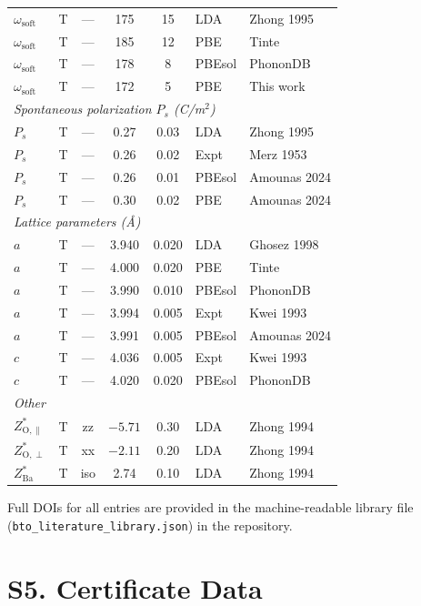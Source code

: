 ﻿\documentclass[prb,onecolumn,superscriptaddress,amsmath,amssymb,longbibliography]{revtex4-2}
\begin{document}
\begin{table}[ht]
\begin{tabular}{llcccll}
$\omega_{\mathrm{soft}}$ & T & --- & 175 & 15 & LDA & Zhong 1995 \\
$\omega_{\mathrm{soft}}$ & T & --- & 185 & 12 & PBE & Tinte \cite{Tinte2003} \\
$\omega_{\mathrm{soft}}$ & T & --- & 178 & 8 & PBEsol & PhononDB \\
$\omega_{\mathrm{soft}}$ & T & --- & 172 & 5 & PBE & This work \\
\midrule
\multicolumn{7}{l}{\textit{Spontaneous polarization $P_s$ (C/m$^2$)}} \\
$P_s$ & T & --- & 0.27 & 0.03 & LDA & Zhong 1995 \\
$P_s$ & T & --- & 0.26 & 0.02 & Expt & Merz 1953 \\
$P_s$ & T & --- & 0.26 & 0.01 & PBEsol & Amounas 2024 \\
$P_s$ & T & --- & 0.30 & 0.02 & PBE & Amounas 2024 \\
\midrule
\multicolumn{7}{l}{\textit{Lattice parameters (\AA)}} \\
$a$ & T & --- & 3.940 & 0.020 & LDA & Ghosez 1998 \\
$a$ & T & --- & 4.000 & 0.020 & PBE & Tinte \cite{Tinte2003} \\
$a$ & T & --- & 3.990 & 0.010 & PBEsol & PhononDB \\
$a$ & T & --- & 3.994 & 0.005 & Expt & Kwei 1993 \\
$a$ & T & --- & 3.991 & 0.005 & PBEsol & Amounas 2024 \\
$c$ & T & --- & 4.036 & 0.005 & Expt & Kwei 1993 \\
$c$ & T & --- & 4.020 & 0.020 & PBEsol & PhononDB \\
\midrule
\multicolumn{7}{l}{\textit{Other}} \\
$Z^*_{\mathrm{O},\parallel}$ & T & zz & $-5.71$ & 0.30 & LDA & Zhong 1994 \\
$Z^*_{\mathrm{O},\perp}$ & T & xx & $-2.11$ & 0.20 & LDA & Zhong 1994 \\
$Z^*_{\mathrm{Ba}}$ & T & iso & 2.74 & 0.10 & LDA & Zhong 1994 \\
\bottomrule
\end{tabular}
\end{table}

\noindent Full DOIs for all entries are provided in the machine-readable
library file (\texttt{bto\_literature\_library.json}) in the repository.


\section{S5. Certificate Data}
\label{sec:si_certs}
\end{document}
